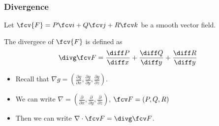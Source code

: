 \begin{frame}
\frametitle{Divergence}


Let $\fcv{F}=P\fcv i+Q\fcv j+R\fcv k$ be a smooth vector field.
\begin{definition}
The divergece of $\fcv{F}$ is defined as
\[
\divg \fcv F =\frac{\diff P}{\diff x}+\frac{\diff Q}{\diff y}+\frac{\diff R}{\diff y}
\]
\end{definition}
\begin{itemize}
\item Recall that $\nabla g =\left(\frac{\partial g}{\partial x}, \frac{\partial g}{\partial y}, \frac{\partial g}{\partial z}  \right)$.
\item We can write $\nabla =\left(\frac{\partial }{\partial x}, \frac{\partial }{\partial y}, \frac{\partial }{\partial z}  \right)$, $\fcv F=\left(P,Q,R\right)$
\item Then we can write $\nabla \cdot \fcv F=\divg \fcv F$. 
\end{itemize}
\end{frame}